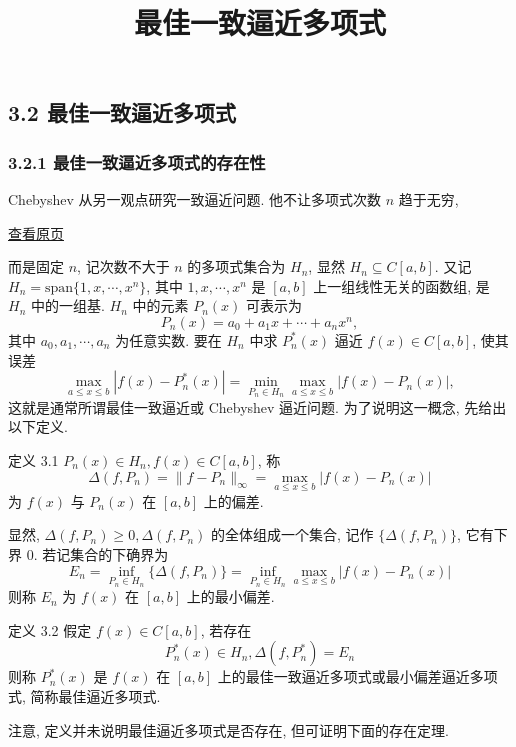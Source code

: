 \documentclass[
  10pt,
  fontset=fandol]{ctexart}
\title{最佳一致逼近多项式}
\author{}
\date{}
\begin{document}
\maketitle

\subsection{3.2 最佳一致逼近多项式}\label{ux6700ux4f73ux4e00ux81f4ux903cux8fd1ux591aux9879ux5f0f}

\subsubsection{3.2.1 最佳一致逼近多项式的存在性}\label{ux6700ux4f73ux4e00ux81f4ux903cux8fd1ux591aux9879ux5f0fux7684ux5b58ux5728ux6027}

Chebyshev 从另一观点研究一致逼近问题. 他不让多项式次数 \(n\) 趋于无穷,

\href{../../source-images/pdf-061.jpeg}{查看原页}

而是固定 \(n\), 记次数不大于 \(n\) 的多项式集合为 \(H_n\), 显然 \(H_n \subseteq C[a,b]\). 又记 \(H_n = \text{span}\{1,x,\cdots,x^n\}\), 其中 \(1,x,\cdots,x^n\) 是 \([a,b]\) 上一组线性无关的函数组, 是 \(H_n\) 中的一组基. \(H_n\) 中的元素 \(P_n(x)\) 可表示为 \[
P_n(x) = a_0 + a_1x + \cdots + a_nx^n,
\] 其中 \(a_0,a_1,\cdots,a_n\) 为任意实数. 要在 \(H_n\) 中求 \(P_n^*(x)\) 逼近 \(f(x) \in C[a,b]\), 使其误差 \[
\max_{a \leqslant x \leqslant b} |f(x) - P_n^*(x)| = \min_{P_n \in H_n} \max_{a \leqslant x \leqslant b} |f(x) - P_n(x)|,
\] 这就是通常所谓最佳一致逼近或 Chebyshev 逼近问题. 为了说明这一概念, 先给出以下定义.

定义 3.1 \(P_n(x) \in H_n, f(x) \in C[a,b]\), 称 \[
\Delta(f,P_n) = \|f - P_n\|_\infty = \max_{a \leqslant x \leqslant b} |f(x) - P_n(x)| \tag{3.2.1}
\] 为 \(f(x)\) 与 \(P_n(x)\) 在 \([a,b]\) 上的偏差.

显然, \(\Delta(f,P_n) \geqslant 0, \Delta(f,P_n)\) 的全体组成一个集合, 记作 \(\{\Delta(f,P_n)\}\), 它有下界 0. 若记集合的下确界为 \[
E_n = \inf_{P_n \in H_n} \{\Delta(f,P_n)\} = \inf_{P_n \in H_n} \max_{a \leqslant x \leqslant b} |f(x) - P_n(x)| \tag{3.2.2}
\] 则称 \(E_n\) 为 \(f(x)\) 在 \([a,b]\) 上的最小偏差.

定义 3.2 假定 \(f(x) \in C[a,b]\), 若存在 \[
P_n^*(x) \in H_n, \Delta(f,P_n^*) = E_n \tag{3.2.3}
\] 则称 \(P_n^*(x)\) 是 \(f(x)\) 在 \([a,b]\) 上的最佳一致逼近多项式或最小偏差逼近多项式, 简称最佳逼近多项式.

注意, 定义并未说明最佳逼近多项式是否存在, 但可证明下面的存在定理.
\end{document}
